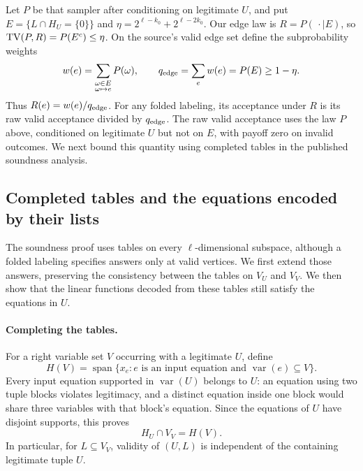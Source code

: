 Let $P$ be that sampler after conditioning on legitimate $U$, and put
$E=\{L\cap H_U=\{0\}\}$ and
$\eta=2^{\ell-k_0}+2^{\ell-2k_0}$.  Our edge law is $R=P(\,\cdot\mid E)$,
so $\operatorname{TV}(P,R)=P(E^c)\leq\eta$.  On the source's valid edge set define
the subprobability weights
\[
 w(e)=\sum_{\substack{\omega\in E\\\omega\mapsto e}}P(\omega),
 \qquad q_{\rm edge}=\sum_e w(e)=P(E)\geq1-\eta.
\]
Thus $R(e)=w(e)/q_{\rm edge}$. For any folded labeling, its acceptance
under $R$ is its raw valid acceptance divided by $q_{\rm edge}$. The raw
valid acceptance uses the law $P$ above, conditioned on legitimate $U$
but not on $E$, with payoff zero on invalid outcomes. We next bound this
quantity using completed tables in the published soundness analysis.

\subsection{Completed tables and the equations encoded by their lists}

The soundness proof uses tables on every $\ell$-dimensional subspace,
although a folded labeling specifies answers only at valid vertices.
We first extend those answers, preserving the consistency between the
tables on $V_U$ and $V_V$.  We then show that the linear functions
decoded from these tables still satisfy the equations in $U$.

\paragraph{Completing the tables.}
For a right variable set $V$ occurring with a legitimate $U$, define
\[
  H(V)=\operatorname{span}\{x_e:e\text{ is an input equation and }
                                     \operatorname{var}(e)\subseteq V\}.
\]
Every input equation supported in $\operatorname{var}(U)$ belongs to
$U$: an equation using two tuple blocks violates legitimacy, and a
distinct equation inside one block would share three variables with
that block's equation.  Since the equations of $U$ have disjoint
supports, this proves
\begin{equation}
  H_U\cap V_V=H(V).
  \label{eq:affine-validity-common-side-space}
\end{equation}
In particular, for $L\subseteq V_V$, validity of $(U,L)$ is independent
of the containing legitimate tuple $U$.

